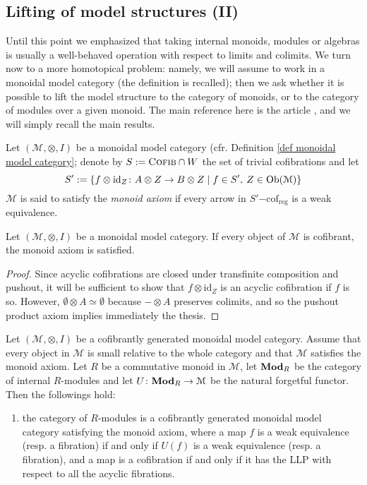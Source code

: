\begin{refsection}
\subsection{Lifting of model structures (II)}

Until this point we emphasized that taking internal monoids, modules or algebras is usually a well-behaved operation with respect to limits and colimits. We turn now to a more homotopical problem: namely, we will assume to work in a monoidal model category (the definition is recalled); then we ask whether it is possible to lift the model structure to the category of monoids, or to the category of modules over a given monoid. The main reference here is the article \cite{schwede}, and we will simply recall the main results.

\begin{defin}
Let $(\mathcal M, \otimes, I)$ be a monoidal model category (cfr. Definition \ref{def monoidal model category}; denote by $S := \textsc{Cofib} \cap W$ the set of trivial cofibrations and let
\[
S' := \{f \otimes \mathrm{id}_Z \colon A \otimes Z \to B \otimes Z \mid f \in S', \: Z \in \operatorname{Ob}(\mathcal M)\}
\]
$\mathcal M$ is said to satisfy the \emph{monoid axiom} if every arrow in $S'\mathrm{-cof}_{\mathrm{reg}}$ is a weak equivalence.
\end{defin}

\begin{lemma}
Let $(\mathcal M, \otimes, I)$ be a monoidal model category. If every object of $\mathcal M$ is cofibrant, the monoid axiom is satisfied.
\end{lemma}

\begin{proof}
Since acyclic cofibrations are closed under transfinite composition and pushout, it will be sufficient to show that $f \otimes \mathrm{id}_Z$ is an acyclic cofibration if $f$ is so. However, $\emptyset \otimes A \simeq \emptyset$ because $- \otimes A$ preserves colimits, and so the pushout product axiom implies immediately the thesis.
\end{proof}

\begin{thm} \label{thm lifting II}
Let $(\mathcal M, \otimes, I)$ be a cofibrantly generated monoidal model category. Assume that every object in $\mathcal M$ is small relative to the whole category and that $\mathcal M$ satisfies the monoid axiom. Let $R$ be a commutative monoid in $\mathcal M$, let $\mathbf{Mod}_R$ be the category of internal $R$-modules and let $U \colon \mathbf{Mod}_R \to \mathcal M$ be the natural forgetful functor. Then the followings hold:
\begin{enumerate}
\item the category of $R$-modules is a cofibrantly generated monoidal model category satisfying the monoid axiom, where a map $f$ is a weak equivalence (resp. a fibration) if and only if $U(f)$ is a weak equivalence (resp. a fibration), and a map is a cofibration if and only if it has the LLP with respect to all the acyclic fibrations.


\end{enumerate}
\end{thm}
\end{refsection}
